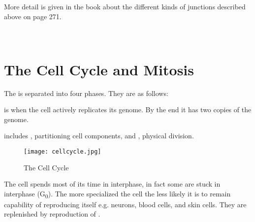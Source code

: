\documentclass[../Bio_chemistryReview.tex]{subfiles}
\begin{document}
More detail is given in the book about the different kinds of junctions
described above on page 271. 
\hfil \\
\hfil \\
\hfil \\

\section{The Cell Cycle and Mitosis}
The  is separated into four phases. They are as follows:
\begin{description}
    \item {} is when the cell actively replicates its
        genome. By the end it has two copies of the genome.
    \item {} includes , partitioning
        cell components, and , physical division.
    \item {}
    \item {}
\end{description}
\begin{figure}[H]
    \centering
    \texttt{[image: cellcycle.jpg]}
    \caption{The Cell Cycle}
\end{figure}

The cell spends most of its time in interphase, in fact some are stuck in
interphase (G\textsubscript{0}). The more specialized the cell the less likely
it is to remain capability of reproducing itself e.g. neurons, blood cells, and
skin cells. They are replenished by reproduction of .\par
\end{document}
